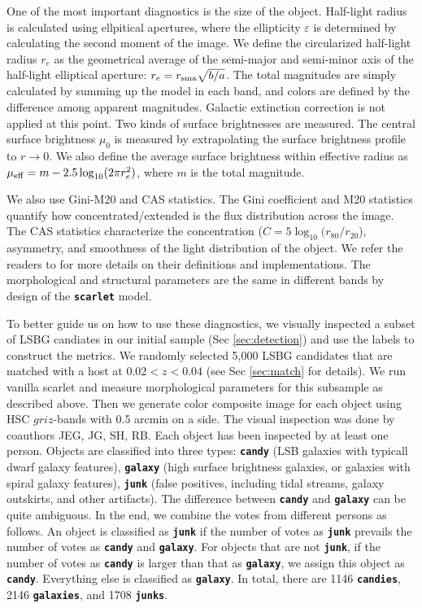 \documentclass[twocolumn,astrosymb,twocolappendix]{aastex631}
\newcommand{\code}[1]{\textbf{\texttt{#1}}}
\begin{document}
\begin{CJK*}{UTF8}{gbsn}
One of the most important diagnostics is the size of the object. Half-light radius is calculated using ellpitical apertures, where the ellipticity $\varepsilon$ is determined by calculating the second moment of the image. We define the circularized half-light radius $r_e$ as the geometrical average of the semi-major and semi-minor axis of the half-light elliptical aperture: $r_e = r_{\rm sma} \sqrt{b/a}$. The total magnitudes are simply calculated by summing up the model in each band, and colors are defined by the difference among apparent magnitudes. Galactic extinction correction is not applied at this point. Two kinds of surface brightnesses are measured. The central surface brightness $\mu_0$ is measured by extrapolating the surface brightness profile to $r\to 0$. We also define the average surface brightness within effective radius as $\mu_{\rm eff} = m - 2.5 \log_{10}(2 \pi r_e^2)$, where $m$ is the total magnitude. 

We also use Gini-M20 and CAS statistics. The Gini coefficient \citep{Abraham2003,Lotz2004} and M20 statistics quantify how concentrated/extended is the flux distribution across the image. The CAS statistics characterize the concentration ($C = 5\log_{10}(r_{80} / r_{20}$), asymmetry, and smoothness of the light distribution of the object. We refer the readers to \citet{statmorph} for more details on their definitions and implementations. The morphological and structural parameters are the same in different bands by design of the \code{scarlet} model.


To better guide us on how to use these diagnostics, we visually inspected a subset of LSBG candiates in our initial sample (Sec \ref{sec:detection}) and use the labels to construct the metrics. We randomly selected 5,000 LSBG candidates that are matched with a host at $0.02 < z < 0.04$ (see Sec \ref{sec:match} for details). We run vanilla scarlet and measure morphological parameters for this subsample as described above. Then we generate color composite image for each object using HSC $griz$-bands with 0.5 arcmin on a side. The visual inspection was done by coauthors JEG, JG, SH, RB. Each object has been inspected by at least one person. Objects are classified into three types: \code{candy} (LSB galaxies with typicall dwarf galaxy features), \code{galaxy} (high surface brightness galaxies, or galaxies with spiral galaxy features), \code{junk} (false positives, including tidal streams, galaxy outskirts, and other artifacts). The difference between \code{candy} and \code{galaxy} can be quite ambiguous. In the end, we combine the votes from different persons as follows. An object is classified as \code{junk} if the number of votes as \code{junk} prevails the number of votes as \code{candy} and \code{galaxy}. For objects that are not \code{junk}, if the number of votes as \code{candy} is larger than that as \code{galaxy}, we assign this object as \code{candy}. Everything else is classified as \code{galaxy}. In total, there are 1146 \code{candies}, 2146 \code{galaxies}, and 1708 \code{junks}.


\end{CJK*}
\end{document}
